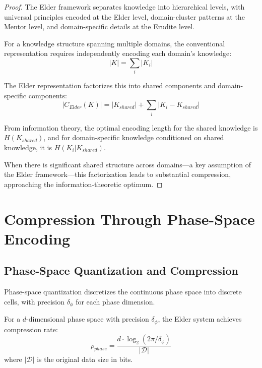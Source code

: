 \begin{proof}
The Elder framework separates knowledge into hierarchical levels, with universal principles encoded at the Elder level, domain-cluster patterns at the Mentor level, and domain-specific details at the Erudite level.

For a knowledge structure spanning multiple domains, the conventional representation requires independently encoding each domain's knowledge:
\begin{equation}
|K| = \sum_i |K_i|
\end{equation}

The Elder representation factorizes this into shared components and domain-specific components:
\begin{equation}
|C_{Elder}(K)| = |K_{shared}| + \sum_i |K_i - K_{shared}|
\end{equation}

From information theory, the optimal encoding length for the shared knowledge is $H(K_{shared})$, and for domain-specific knowledge conditioned on shared knowledge, it is $H(K_i | K_{shared})$.

When there is significant shared structure across domains—a key assumption of the Elder framework—this factorization leads to substantial compression, approaching the information-theoretic optimum.
\end{proof}

\section{Compression Through Phase-Space Encoding}

\subsection{Phase-Space Quantization and Compression}

\begin{definition}
Phase-space quantization discretizes the continuous phase space into discrete cells, with precision $\delta_{\phi}$ for each phase dimension.
\end{definition}

\begin{theorem}
For a $d$-dimensional phase space with precision $\delta_{\phi}$, the Elder system achieves compression rate:
\begin{equation}
\rho_{phase} = \frac{d \cdot \log_2(2\pi/\delta_{\phi})}{|\mathcal{D}|}
\end{equation}
where $|\mathcal{D}|$ is the original data size in bits.
\end{theorem}

